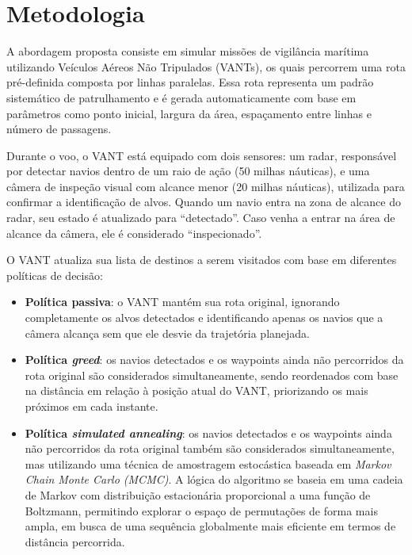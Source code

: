 \section{Metodologia}

A abordagem proposta consiste em simular missões de vigilância marítima utilizando Veículos Aéreos Não Tripulados (VANTs), os quais percorrem uma rota pré-definida composta por linhas paralelas. Essa rota representa um padrão sistemático de patrulhamento e é gerada automaticamente com base em parâmetros como ponto inicial, largura da área, espaçamento entre linhas e número de passagens.

Durante o voo, o VANT está equipado com dois sensores: um radar, responsável por detectar navios dentro de um raio de ação (50 milhas náuticas), e uma câmera de inspeção visual com alcance menor (20 milhas náuticas), utilizada para confirmar a identificação de alvos. Quando um navio entra na zona de alcance do radar, seu estado é atualizado para ``detectado''. Caso venha a entrar na área de alcance da câmera, ele é considerado ``inspecionado''.

O VANT atualiza sua lista de destinos a serem visitados com base em diferentes políticas de decisão:

\begin{itemize}
    \item \textbf{Política passiva}: o VANT mantém sua rota original, ignorando completamente os alvos detectados e identificando apenas os navios que a câmera alcança sem que ele desvie da trajetória planejada.

    \item \textbf{Política \textit{greed}}: os navios detectados e os waypoints ainda não percorridos da rota original são considerados simultaneamente, sendo reordenados com base na distância em relação à posição atual do VANT, priorizando os mais próximos em cada instante.
    \item \textbf{Política \textit{simulated annealing}}: os navios detectados e os waypoints ainda não percorridos da rota original também são considerados simultaneamente, mas utilizando uma técnica de amostragem estocástica baseada em \textit{Markov Chain Monte Carlo (MCMC)}. A lógica do algoritmo se baseia em uma cadeia de Markov com distribuição estacionária proporcional a uma função de Boltzmann, permitindo explorar o espaço de permutações de forma mais ampla, em busca de uma sequência globalmente mais eficiente em termos de distância percorrida.
\end{itemize}

